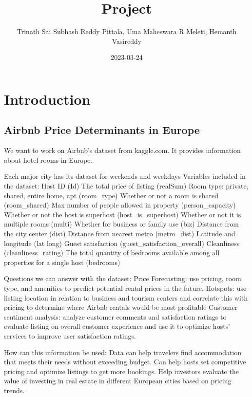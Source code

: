 \documentclass[
]{article}
\title{Project}
\author{Trinath Sai Subhash Reddy Pittala, Uma Maheswara R Meleti,
Hemanth Vasireddy}
\date{2023-03-24}
\begin{document}
\maketitle

\hypertarget{introduction}{%
\section{Introduction}\label{introduction}}

\hypertarget{airbnb-price-determinants-in-europe}{%
\subsection{Airbnb Price Determinants in
Europe}\label{airbnb-price-determinants-in-europe}}

We want to work on Airbnb's dataset from kaggle.com. It provides
information about hotel rooms in Europe.

Each major city has its dataset for weekends and weekdays Variables
included in the dataset: Host ID (Id) The total price of listing
(realSum) Room type: private, shared, entire home, apt (room\_type)
Whether or not a room is shared (room\_shared) Max number of people
allowed in property (person\_capacity) Whether or not the host is
superhost (host\_is\_superhost) Whether or not it is multiple rooms
(multi) Whether for business or family use (biz) Distance from the city
center (dist) Distance from nearest metro (metro\_dist) Latitude and
longitude (lat long) Guest satisfaction (guest\_satisfaction\_overall)
Cleanliness (cleanliness\_rating) The total quantity of bedrooms
available among all properties for a single host (bedrooms)

Questions we can answer with the dataset: Price Forecasting: use
pricing, room type, and amenities to predict potential rental prices in
the future. Hotspots: use listing location in relation to business and
tourism centers and correlate this with pricing to determine where
Airbnb rentals would be most profitable Customer sentiment analysis:
analyze customer comments and satisfaction ratings to evaluate listing
on overall customer experience and use it to optimize hosts' services to
improve user satisfaction ratings.

How can this information be used: Data can help travelers find
accommodation that meets their needs without exceeding budget. Can help
hosts set competitive pricing and optimize listings to get more
bookings. Help investors evaluate the value of investing in real estate
in different European cities based on pricing trends.
\end{document}
